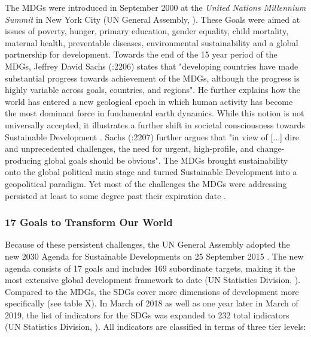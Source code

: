 		        The MDGs were introduced in September 2000 at the \textit{United Nations Millennium Summit} in New York City (UN General Assembly, \citeyear{ungeneralassembly2000}). These Goals were aimed at issues of poverty, hunger, primary education, gender equality, child mortality, maternal health, preventable diseases, environmental sustainability and a global partnership for development. Towards the end of the 15 year period of the MDGs, Jeffrey David Sachs (\citeyear{sachs2012}:2206) states that "developing countries have made substantial progress towards achievement of the MDGs, although the progress is highly variable across goals, countries, and regions". He further explains how the world has entered a new geological epoch in which human activity has become the most dominant force in fundamental earth dynamics. While this notion is not universally accepted, it illustrates a further shift in societal consciousness towards Sustainable Development \citep{heikkurinen2019}. Sachs (\citeyear{sachs2012}:2207) further argues that "in view of [...] dire and unprecedented challenges, the need for urgent, high-profile, and change-producing global goals should be obvious". The MDGs brought sustainability onto the global political main stage and turned Sustainable Development into a geopolitical paradigm. Yet most of the challenges the MDGs were addressing persisted at least to some degree past their expiration date \citep{sachs2012}.
		        

		    \subsubsection{17 Goals to Transform Our World}
	            
	            Because of these persistent challenges, the UN General Assembly adopted the new 2030 Agenda for Sustainable Developments on 25 September 2015 \citep{unitednations2018}. The new agenda consists of 17 goals and includes 169 subordinate targets, making it the most extensive global development framework to date (UN Statistics Division, \citeyear{unitednationsstatisticsdivision2019a}). Compared to the MDGs, the SDGs cover more dimensions of development more specifically (see table X). In March of 2018 as well as one year later in March of 2019, the list of indicators for the SDGs was expanded to 232 total indicators (UN Statistics Division, \citeyear{unitednationsstatisticsdivision2019}). All indicators are classified in terms of three tier levels:
	            
